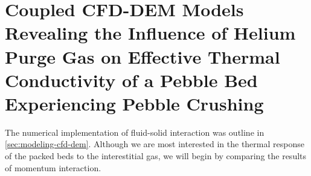 \chapter{Coupled CFD-DEM Models Revealing the Influence of Helium Purge Gas on Effective Thermal Conductivity of a Pebble Bed Experiencing Pebble Crushing}\label{sec:cfd-dem-studies}
The numerical implementation of fluid-solid interaction was outline in \cref{sec:modeling-cfd-dem}. Although we are most interested in the thermal response of the packed beds to the interestitial gas, we will begin by comparing the results of momentum interaction. 


